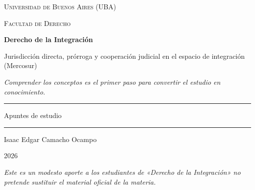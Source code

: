 \documentclass[12pt,oneside]{book}
\newcommand{\universidad}{Universidad de Buenos Aires (UBA)}
\newcommand{\facultad}{Facultad de Derecho}
\newcommand{\materia}{Derecho de la Integración}
\newcommand{\titulo}{Jurisdicción directa, prórroga y cooperación judicial en el espacio de integración (Mercosur)}
\newcommand{\autor}{Isaac Edgar Camacho Ocampo}
\newcommand{\anio}{2026}
\begin{document}
\begin{titlepage}

\thispagestyle{empty}

\begin{center}

\vspace*{0.5cm}

{\large \textsc{\universidad}}

\vspace{0.2cm}

{\large \textsc{\facultad}}

\vspace{2.2cm}

{\Huge \textbf{\materia}}

\vspace{0.8cm}

{\LARGE \titulo}

\vspace{0.8cm}

\textit{Comprender los conceptos es el primer paso para convertir el estudio en conocimiento.}

\vspace{1.2cm}

\rule{0.70\textwidth}{0.5pt}

\vspace{0.5cm}

{\large Apuntes de estudio}

\vspace{0.5cm}

\rule{0.70\textwidth}{0.5pt}

\vfill

{\large \autor}

\vspace{0.3cm}

{\large \anio}

\end{center}

\vfill

\begin{flushleft}
\textit{Este es un modesto aporte a los estudiantes de «\materia» no pretende sustituir el material oficial de la materia.}
\end{flushleft}

\end{titlepage}

\tableofcontents
\clearpage
{}
\end{document}
